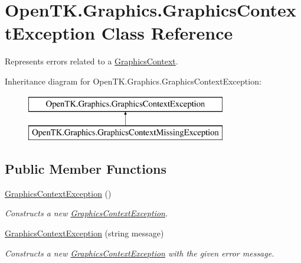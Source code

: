 \hypertarget{class_open_t_k_1_1_graphics_1_1_graphics_context_exception}{\section{Open\-T\-K.\-Graphics.\-Graphics\-Context\-Exception Class Reference}
\label{class_open_t_k_1_1_graphics_1_1_graphics_context_exception}
}


Represents errors related to a \hyperlink{class_open_t_k_1_1_graphics_1_1_graphics_context}{Graphics\-Context}.  


Inheritance diagram for Open\-T\-K.\-Graphics.\-Graphics\-Context\-Exception\-:\begin{figure}[H]
\begin{center}
\leavevmode
\includegraphics[height=2.000000cm]{class_open_t_k_1_1_graphics_1_1_graphics_context_exception}
\end{center}
\end{figure}
\subsection*{Public Member Functions}
\begin{DoxyCompactItemize}
\item 
\hyperlink{class_open_t_k_1_1_graphics_1_1_graphics_context_exception_a833dfff1800292539696095561cc82ba}{Graphics\-Context\-Exception} ()
\begin{DoxyCompactList}\small\item\em Constructs a new \hyperlink{class_open_t_k_1_1_graphics_1_1_graphics_context_exception}{Graphics\-Context\-Exception}. \end{DoxyCompactList}\item 
\hyperlink{class_open_t_k_1_1_graphics_1_1_graphics_context_exception_a7f675759af78e8e71b8fe108d9b8154c}{Graphics\-Context\-Exception} (string message)
\begin{DoxyCompactList}\small\item\em Constructs a new \hyperlink{class_open_t_k_1_1_graphics_1_1_graphics_context_exception}{Graphics\-Context\-Exception} with the given error message. \end{DoxyCompactList}\end{DoxyCompactItemize}


